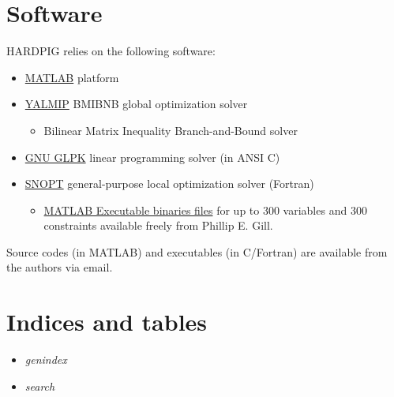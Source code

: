 \documentclass[a4paper,10pt,english]{sphinxmanual}
\begin{document}
\begin{DUlineblock}{0em}
\item[] 
\item[] 
\item[] 
\end{DUlineblock}


\chapter{Software}
\label{index:software}
HARDPIG relies on the following software:
\begin{itemize}
\item {} 
\href{http://www.mathworks.com}{MATLAB} platform

\item {} 
\href{http://users.isy.liu.se/johanl/yalmip/pmwiki.php?n=Solvers.BMIBNB}{YALMIP} BMIBNB global optimization solver
\begin{itemize}
\item {} 
Bilinear Matrix Inequality Branch-and-Bound solver

\end{itemize}

\item {} 
\href{http://www.gnu.org/software/glpk/}{GNU GLPK} linear programming
solver (in ANSI C)

\item {} 
\href{http://www.sbsi-sol-optimize.com/asp/sol\_products\_snopt\_desc.htm}{SNOPT} general-purpose local optimization solver (Fortran)
\begin{itemize}
\item {} 
\href{http://www.scicomp.ucsd.edu/~peg/Software.html}{MATLAB Executable binaries files} for up to 300 variables and 300 constraints available freely from Phillip E. Gill.

\end{itemize}

\end{itemize}

Source codes (in MATLAB) and executables (in C/Fortran) are available from the authors via email.


\chapter{Indices and tables}
\label{index:indices-and-tables}\begin{itemize}
\item {} 
\emph{genindex}

\item {} 
\emph{search}

\end{itemize}
\end{document}
